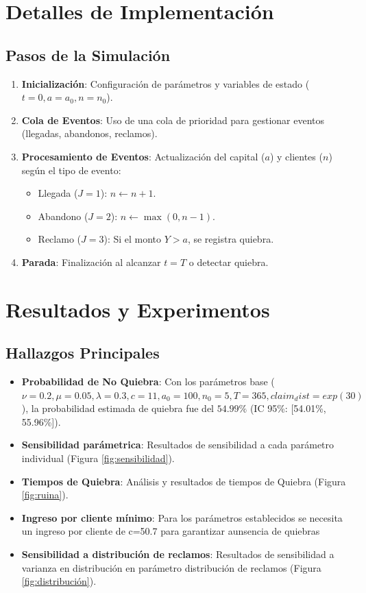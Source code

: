 \documentclass{article}
\begin{document}
\section{Detalles de Implementación}
\subsection{Pasos de la Simulación}
\begin{enumerate}
    \item \textbf{Inicialización}: Configuración de parámetros y variables de estado (\( t=0, a=a_0, n=n_0 \)).
    \item \textbf{Cola de Eventos}: Uso de una cola de prioridad para gestionar eventos (llegadas, abandonos, reclamos).
    \item \textbf{Procesamiento de Eventos}: Actualización del capital (\( a \)) y clientes (\( n \)) según el tipo de evento:
        \begin{itemize}
            \item Llegada (\( J=1 \)): \( n \leftarrow n+1 \).
            \item Abandono (\( J=2 \)): \( n \leftarrow \max(0, n-1) \).
            \item Reclamo (\( J=3 \)): Si el monto \( Y > a \), se registra quiebra.
        \end{itemize}
    \item \textbf{Parada}: Finalización al alcanzar \( t = T \) o detectar quiebra.
\end{enumerate}

\section{Resultados y Experimentos}
\subsection{Hallazgos Principales}
\begin{itemize}
    \item \textbf{Probabilidad de No Quiebra}: Con los parámetros base (\( \nu=0.2, \mu=0.05, \lambda=0.3, c=11, a_0=100, n_0=5, T=365, claim_dist=exp(30) \)), la probabilidad estimada de quiebra fue del \( 54.99\% \) (IC 95\%: [54.01\%, 55.96\%]).
    \item \textbf{Sensibilidad parámetrica}: Resultados de sensibilidad a cada parámetro individual (Figura \ref{fig:sensibilidad}).
    \item \textbf{Tiempos de Quiebra}: Análisis y resultados de tiempos de Quiebra (Figura \ref{fig:ruina}).
    \item \textbf{Ingreso por cliente mínimo}: Para los parámetros establecidos se necesita un ingreso por cliente de c=50.7 para garantizar aunsencia de quiebras
    \item \textbf{Sensibilidad a distribución de reclamos}: Resultados de sensibilidad a varianza en distribución en  parámetro distribución de reclamos (Figura \ref{fig:distribución}).
    
\end{itemize}
\end{document}
